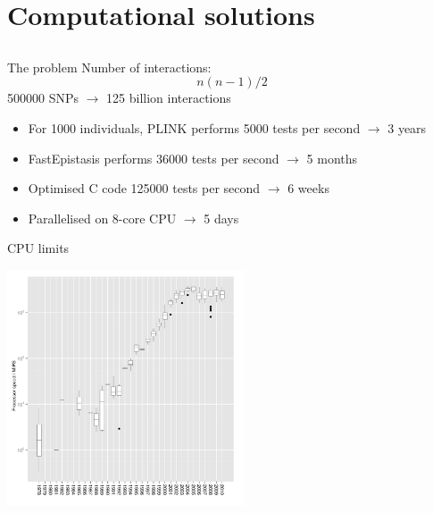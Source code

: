 \documentclass{beamer}
\begin{document}
\section{Computational solutions}
\subsection{}

\begin{frame}{The problem}
Number of interactions: \\
\begin{equation}
n(n-1) / 2 \nonumber
\end{equation}
500000 SNPs $\rightarrow$ 125 billion interactions \\
\begin{itemize}
\item For 1000 individuals, PLINK performs 5000 tests per second $\rightarrow$ 3 years
\item FastEpistasis performs 36000 tests per second $\rightarrow$ 5 months
\item Optimised C code 125000 tests per second $\rightarrow$ 6 weeks
\item Parallelised on 8-core CPU $\rightarrow$ 5 days
\end{itemize}
\end{frame}


\begin{frame}{CPU limits}
\begin{center}
\includegraphics[height=7cm]{clockspeed.pdf}
\end{center}
\end{frame}
\end{document}
